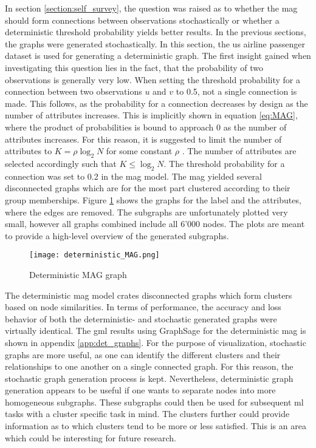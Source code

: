   In section \ref{section:self_survey}, the question was raised 
  as to whether the \acs{mag} should form connections between observations
  stochastically or whether a deterministic threshold probability yields better 
  results. In the previous sections, the graphs were generated stochastically.
  In this section, the \acs{us} airline passenger dataset is used for 
  generating a deterministic graph. The first insight gained when investigating 
  this question lies in the fact, that the probability of two observations is 
  generally very low. When setting the threshold probability for a connection 
  between two observations $u$ and $v$ to 0.5, not a single connection is made. 
  This follows, as the probability for a connection decreases by design as the 
  number of attributes increases. This is implicitly shown in equation 
  \ref{eq:MAG}, where the product of probabilities is bound to approach 0 as
  the number of attributes increases. For this reason, it is suggested to limit 
  the number of attributes to $K=\rho\log_{2}N$ for some constant $\rho$ 
  \citep[p. 122]{kim2012multiplicative}. The number of attributes are selected 
  accordingly such that $K\leqslant\log_{2} N$. The threshold probability for a 
  connection was set to 0.2 in the \acs{mag} model. The \acs{mag} yielded 
  several disconnected graphs which are for the most part clustered according to 
  their group memberships. Figure \ref{fig:det_MAG} shows the graphs for the 
  label and the attributes, where the edges are removed. The subgraphs are 
  unfortunately plotted very small, however all graphs combined include all 
  6'000 nodes. The plots are meant to provide a high-level overview of the 
  generated subgraphs. 

  \begin{figure}[h]
		\centering
		\texttt{[image: deterministic\_MAG.png]}
		\caption{Deterministic MAG graph}
        \label{fig:det_MAG}
  \end{figure}

  \noindent The deterministic \acs{mag} model crates disconnected graphs which 
  form clusters based on node similarities. In terms of performance, the accuracy 
  and loss behavior of both the deterministic- and stochastic generated graphs 
  were virtually identical. The \acs{gml} results using GraphSage for the
  deterministic \acs{mag} is shown in appendix \ref{app:det_graphs}. For the 
  purpose of visualization, stochastic graphs are more useful, as one can 
  identify the different clusters and their relationships to one another on a 
  single connected graph. For this reason, the stochastic graph generation 
  process is kept. Nevertheless, deterministic graph generation appears to be 
  useful if one wants to separate nodes into more homogeneous subgraphs. These 
  subgraphs could then be used for subsequent \acs{ml} tasks with a cluster 
  specific task in mind. The clusters further could provide information as to 
  which clusters tend to be more or less satisfied. This is an area which could 
  be interesting for future research.
  
